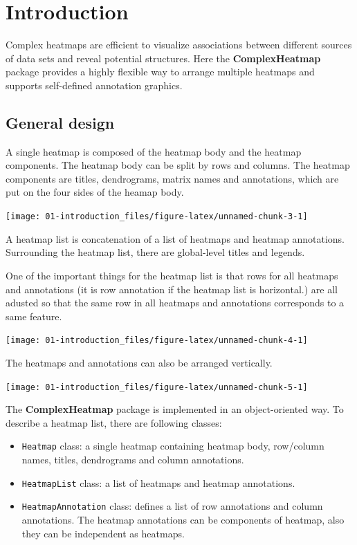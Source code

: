 \documentclass[]{book}
\providecommand{\tightlist}{%
  \setlength{\itemsep}{0pt}\setlength{\parskip}{0pt}}
\theoremstyle{definition}
\theoremstyle{definition}
\theoremstyle{definition}
\theoremstyle{remark}
\begin{document}
\chapter{Introduction}\label{introduction}

Complex heatmaps are efficient to visualize associations between
different sources of data sets and reveal potential structures. Here the
\textbf{ComplexHeatmap} package provides a highly flexible way to
arrange multiple heatmaps and supports self-defined annotation graphics.

\section{General design}\label{general-design}

A single heatmap is composed of the heatmap body and the heatmap
components. The heatmap body can be split by rows and columns. The
heatmap components are titles, dendrograms, matrix names and
annotations, which are put on the four sides of the heamap body.

\begin{center}\texttt{[image: 01-introduction\_files/figure-latex/unnamed-chunk-3-1]} \end{center}

A heatmap list is concatenation of a list of heatmaps and heatmap
annotations. Surrounding the heatmap list, there are global-level titles
and legends.

One of the important things for the heatmap list is that rows for all
heatmaps and annotations (it is row annotation if the heatmap list is
horizontal.) are all adusted so that the same row in all heatmaps and
annotations corresponds to a same feature.

\begin{center}\texttt{[image: 01-introduction\_files/figure-latex/unnamed-chunk-4-1]} \end{center}

The heatmaps and annotations can also be arranged vertically.

\begin{center}\texttt{[image: 01-introduction\_files/figure-latex/unnamed-chunk-5-1]} \end{center}

The \textbf{ComplexHeatmap} package is implemented in an object-oriented
way. To describe a heatmap list, there are following classes:

\begin{itemize}
\tightlist
\item
  \texttt{Heatmap} class: a single heatmap containing heatmap body,
  row/column names, titles, dendrograms and column annotations.
\item
  \texttt{HeatmapList} class: a list of heatmaps and heatmap
  annotations.
\item
  \texttt{HeatmapAnnotation} class: defines a list of row annotations
  and column annotations. The heatmap annotations can be components of
  heatmap, also they can be independent as heatmaps.
\end{itemize}
\end{document}
